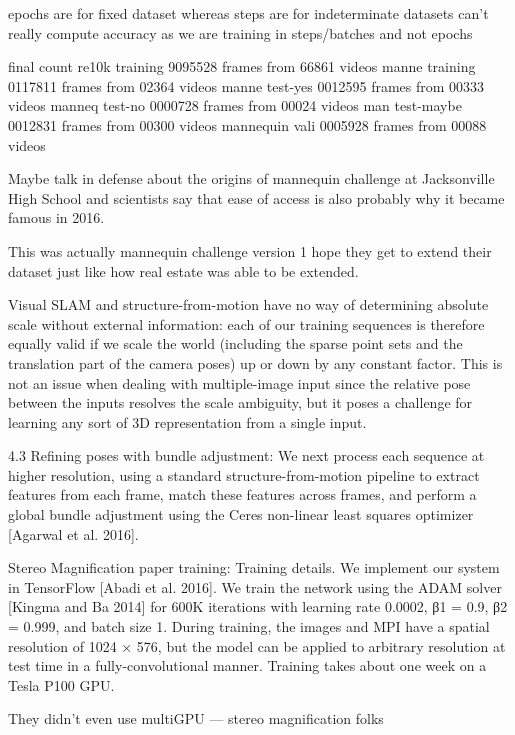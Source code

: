 epochs are for fixed dataset whereas steps are for indeterminate datasets
can't really compute accuracy as we are training in steps/batches and not epochs

final count 
re10k training 9095528 frames from 66861 videos 
manne training 0117811 frames from 02364 videos
manne test-yes 0012595 frames from 00333 videos
manneq test-no 0000728 frames from 00024 videos
man test-maybe 0012831 frames from 00300 videos
mannequin vali 0005928 frames from 00088 videos

Maybe talk in defense about the origins of mannequin challenge at Jacksonville High School and scientists say that ease of access is also probably why it became famous in 2016.

This was actually mannequin challenge version 1 hope they get to extend their dataset just like how real estate was able to be extended.

Visual SLAM and structure-from-motion have no way of determining absolute scale without external information: each of our training sequences is therefore equally valid if we scale the world (including the sparse point sets and the translation part of the camera poses) up or down by any constant factor. This is not an issue when dealing with multiple-image input since the relative pose between the inputs resolves the scale ambiguity, but it poses a challenge for learning any sort of 3D representation from a single input.

4.3 Refining poses with bundle adjustment: 
We next process each sequence at higher resolution, using a standard structure-from-motion pipeline to extract features from each frame, match these features across frames, and perform a global bundle adjustment using the Ceres non-linear least squares optimizer [Agarwal et al. 2016].

Stereo Magnification paper training:
Training details. We implement our system in TensorFlow [Abadi et al. 2016]. We train the network using the ADAM solver [Kingma and Ba 2014] for 600K iterations with learning rate 0.0002, β1 = 0.9, β2 = 0.999, and batch size 1. During training, the images and MPI have a spatial resolution of 1024 × 576, but the model can be applied to arbitrary resolution at test time in a fully-convolutional manner. Training takes about one week on a Tesla P100 GPU.

They didn't even use multiGPU — stereo magnification folks